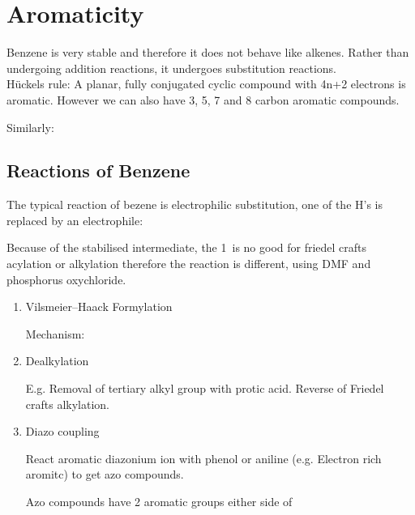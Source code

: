 \section{Aromaticity}

Benzene is very stable and therefore it does not behave like alkenes.
Rather than undergoing addition reactions, it undergoes substitution reactions.\\

H\"uckels rule: A planar, fully conjugated cyclic compound with 4n+2 electrons is aromatic.
However we can also have 3, 5, 7 and 8 carbon aromatic compounds.


Similarly:


\subsection{Reactions of Benzene}

The typical reaction of bezene is electrophilic substitution, one of the H's is replaced by an electrophile:


Because of the stabilised intermediate, the 1\dec\ is no good for friedel crafts acylation or alkylation therefore the reaction is different, using DMF and phosphorus oxychloride.

\begin{enumerate}[label=\alph*)]

  \item Vilsmeier--Haack Formylation


    Mechanism:


  \item Dealkylation

    E.g. Removal of tertiary alkyl group with protic acid.
    Reverse of Friedel crafts alkylation.


  \item Diazo coupling

    React aromatic diazonium ion with phenol or aniline (e.g. Electron rich aromitc) to get azo compounds.


    Azo compounds have 2 aromatic groups either side of 

\end{enumerate}

